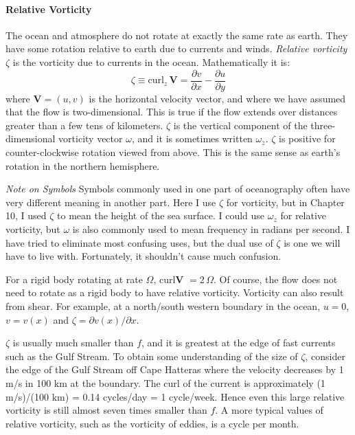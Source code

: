 \paragraph{Relative Vorticity}
The ocean and atmosphere do not rotate at exactly the same rate as
earth. They have some rotation relative to earth due to currents and
winds. \textit{Relative vorticity}
$\zeta$ is the vorticity due to currents in the ocean. Mathematically
it is:
\begin{equation}
\boxed{ \zeta \equiv \text{curl}_z\, \textbf{V} =
\frac{\partial{v}}{\partial{x}}-\frac{\partial{u}}{\partial{y}} }
\end{equation}
where $\textbf{V} = (u, v)$ is the horizontal velocity vector, and
where we have assumed that the flow is two-dimensional. This is true
if the flow extends over distances greater than a few tens of
kilometers. $\zeta $ is the vertical component of the
three-dimensional vorticity vector $\omega$, and it is sometimes
written $\omega{_z}$. $\zeta$ is positive for counter-clockwise
rotation viewed from above. This is the same sense as earth's rotation
in the northern hemisphere.

\textit{Note on Symbols} Symbols commonly used in one part of
oceanography often have very different meaning in another part. Here I
use $\zeta$ for vorticity, but in Chapter 10, I used $\zeta$ to mean
the height of the sea surface. I could use $\omega_z$ for relative
vorticity, but $\omega$ is also commonly used to mean frequency in
radians per second. I have tried to eliminate most confusing uses, but
the dual use of $\zeta$ is one we will have to live with. Fortunately,
it shouldn't cause much confusion.

For a rigid body rotating at rate $\Omega$, curl\textbf{V} $=2\,\Omega$.
Of course, the flow does not need to rotate as a rigid
body to have relative vorticity. Vorticity can also result from
shear. For example, at a north/south western boundary in the ocean,
$u=0$, $v=v(x)$ and $\zeta = \partial{v(x)}/\partial{x}$.

$\zeta$ is usually much smaller than $f$, and it is greatest at the
edge of fast currents such as the Gulf Stream. To obtain some understanding of the size of
$\zeta$, consider the edge of the Gulf Stream off Cape Hatteras where
the velocity decreases by 1 m/s in 100 km at the boundary. The curl of
the current is approximately (1 m/s)/(100 km) = 0.14 cycles/day = 1
cycle/week. Hence even this large relative vorticity is still almost
seven times smaller than $f$. A more typical values of relative
vorticity, such as the vorticity of eddies, is a cycle per month.

